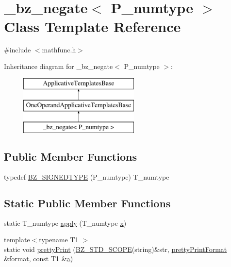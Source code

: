 \hypertarget{class__bz__negate}{}\section{\+\_\+bz\+\_\+negate$<$ P\+\_\+numtype $>$ Class Template Reference}
\label{class__bz__negate}


{\ttfamily \#include $<$mathfunc.\+h$>$}

Inheritance diagram for \+\_\+bz\+\_\+negate$<$ P\+\_\+numtype $>$\+:\begin{figure}[H]
\begin{center}
\leavevmode
\includegraphics[height=3.000000cm]{class__bz__negate}
\end{center}
\end{figure}
\subsection*{Public Member Functions}
\begin{DoxyCompactItemize}
\item 
typedef \hyperlink{class__bz__negate_a22b6292d81f688f8106e0f47f62a6f3b}{B\+Z\+\_\+\+S\+I\+G\+N\+E\+D\+T\+Y\+P\+E} (P\+\_\+numtype) T\+\_\+numtype
\end{DoxyCompactItemize}
\subsection*{Static Public Member Functions}
\begin{DoxyCompactItemize}
\item 
static T\+\_\+numtype \hyperlink{class__bz__negate_a1057af68ac5015a586dca79529e2b14f}{apply} (T\+\_\+numtype \hyperlink{vecnorm1_8cc_ac73eed9e41ec09d58f112f06c2d6cb63}{x})
\item 
{\footnotesize template$<$typename T1 $>$ }\\static void \hyperlink{class__bz__negate_aa3c43aa4fd9b0ab9d03e1d10515ce58e}{pretty\+Print} (\hyperlink{numinquire_8h_a2b24ffc3b4ef9803956bc7715c6c7b83}{B\+Z\+\_\+\+S\+T\+D\+\_\+\+S\+C\+O\+P\+E}(string)\&str, \hyperlink{classprettyPrintFormat}{pretty\+Print\+Format} \&format, const T1 \&\hyperlink{gen__mat5files_8m_aae328bf20413f220e38aec4d95bfd6da}{a})
\end{DoxyCompactItemize}


